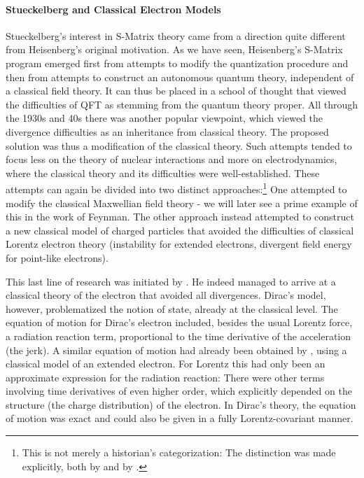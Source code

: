 \documentclass[12pt]{article}
\begin{document}
\paragraph{Stueckelberg and Classical Electron Models}

Stueckelberg's interest in S-Matrix theory came from a direction quite different from Heisenberg's original motivation. As we have seen, Heisenberg's S-Matrix program emerged first from attempts to modify the quantization procedure and then from attempts to construct an autonomous quantum theory, independent of a classical field theory. It can thus be placed in a school of thought that viewed the difficulties of QFT as stemming from the quantum theory proper. All through the 1930s and 40s there was another popular viewpoint, which viewed the divergence difficulties as an inheritance from classical theory. The proposed solution was thus a modification of the classical theory. Such attempts tended to focus less on the theory of nuclear interactions and more on electrodynamics, where the classical theory and its difficulties were well-established. These attempts can again be divided into two distinct approaches:\footnote{This is not merely a historian's categorization: The distinction was made explicitly, both by \citet[p. 149]{dirac_1938_classical} and by \citet[p. 52]{stueckelberg_1941_un-nouveau}.} One attempted to modify the classical Maxwellian field theory - we will later see a prime example of this in the work of Feynman. The other approach instead attempted to construct a new classical model of charged particles that avoided the difficulties of classical Lorentz electron theory (instability for extended electrons, divergent field energy for point-like electrons).

This last line of research was initiated by \citet{dirac_1938_classical}. He indeed managed to arrive at a classical theory of the electron that avoided all divergences. Dirac's model, however, problematized the notion of state, already at the classical level. The equation of motion for Dirac's electron included, besides the usual Lorentz force, a radiation reaction term, proportional to the time derivative of the acceleration (the jerk). A similar equation of motion had already been obtained by \citet[p. 49]{lorentz_1916_the-theory}, using a classical model of an extended electron. For Lorentz this had only been an approximate expression for the radiation reaction: There were other terms involving time derivatives of even higher order, which explicitly depended on the structure (the charge distribution) of the electron. In Dirac's theory, the equation of motion was exact and could also be given in a fully Lorentz-covariant manner.
\end{document}
